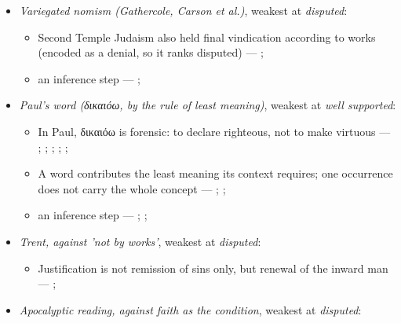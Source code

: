 \documentclass[11pt]{article}
\begin{document}
\begin{itemize}
\begin{itemize}
\item Justification and sanctification are inseparable but distinct --- \cite[XIII.1]{westminster-confession-1647}; \cite[XI.1]{westminster-confession-1647}; \cite[III.xi.6]{calvin-institutes-1960}
\item an inference step --- \cite[Trent, Session VI (1547), canon 9]{tanner-decrees-1990}
\end{itemize}
\item \emph{Variegated nomism (Gathercole, Carson et al.)}, weakest at \emph{disputed}:
\begin{itemize}
\item Second Temple Judaism also held final vindication according to works (encoded as a denial, so it ranks disputed) --- \cite{gathercole-where-boasting-2002}; \cite{carson-variegated-nomism-1-2001}
\item an inference step --- \cite{gathercole-where-boasting-2002}; \cite{carson-variegated-nomism-1-2001}
\end{itemize}
\item \emph{Paul's word (δικαιόω, by the rule of least meaning)}, weakest at \emph{well supported}:
\begin{itemize}
\item In Paul, δικαιόω is forensic: to declare righteous, not to make virtuous --- \cite[s.v. δικαιόω]{bauer-danker-lexicon-2000}; \cite{morris-apostolic-preaching-1965}; \cite[p. 80]{moo-romans-1996}; \cite{irons-righteousness-of-god-2015}; \cite{wright-justification-2009}; \cite[ad loc. Rom 3:24]{fitzmyer-romans-1993}
\item A word contributes the least meaning its context requires; one occurrence does not carry the whole concept --- \cite{silva-biblical-words-1994}; \cite{joos-semantic-axiom-1972}; \cite{barr-semantics-2004}
\item an inference step --- \cite{silva-biblical-words-1994}; \cite[p. 80]{moo-romans-1996}; \cite{barr-semantics-2004}
\end{itemize}
\item \emph{Trent, against 'not by works'}, weakest at \emph{disputed}:
\begin{itemize}
\item Justification is not remission of sins only, but renewal of the inward man --- \cite[Trent, Session VI (1547), Decree on Justification, ch. 7]{tanner-decrees-1990}; \cite[Trent, Session VI (1547), canon 11]{tanner-decrees-1990}
\end{itemize}
\item \emph{Apocalyptic reading, against faith as the condition}, weakest at \emph{disputed}:

\end{itemize}
\end{document}

